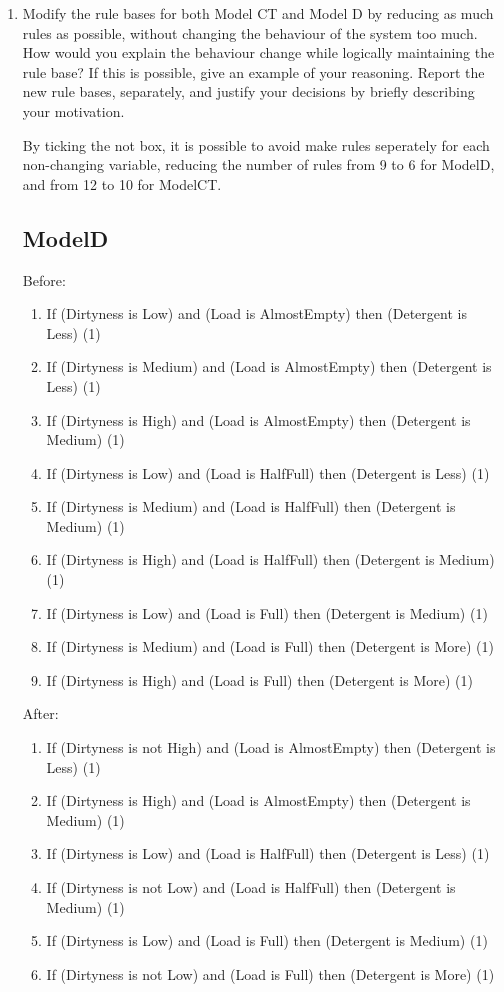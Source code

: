 \documentclass[11pt]{article}
\begin{document}
\begin{enumerate}[label=(\alph*)]
  \item Modify the rule bases for both Model CT and Model D by reducing as much
  rules as possible, without changing the behaviour of the system too much. How
  would you explain the behaviour change while logically maintaining the rule
  base? If this is possible, give an example of your reasoning. Report the new
  rule bases, separately, and justify your decisions by briefly describing your
  motivation.

  By ticking the not box, it is possible to avoid make rules seperately for each
  non-changing variable, reducing the number of rules from 9 to 6 for ModelD,
  and from 12 to 10 for ModelCT.

  \subsection*{ModelD}

  Before:
  \begin{enumerate}[label=(\arabic*)]
    \item If (Dirtyness is Low) and (Load is AlmostEmpty) then (Detergent is
    Less) (1)
    \item If (Dirtyness is Medium) and (Load is AlmostEmpty) then (Detergent is
    Less) (1)
    \item If (Dirtyness is High) and (Load is AlmostEmpty) then (Detergent is
    Medium) (1)
    \item If (Dirtyness is Low) and (Load is HalfFull) then (Detergent is Less)
    (1)
    \item If (Dirtyness is Medium) and (Load is HalfFull) then (Detergent is
    Medium) (1)
    \item If (Dirtyness is High) and (Load is HalfFull) then (Detergent is
    Medium) (1)
    \item If (Dirtyness is Low) and (Load is Full) then (Detergent is Medium)
    (1)
    \item If (Dirtyness is Medium) and (Load is Full) then (Detergent is More)
    (1)
    \item If (Dirtyness is High) and (Load is Full) then (Detergent is More) (1)
  \end{enumerate}

  After:
  \begin{enumerate}[label=(\arabic*)]
    \item If (Dirtyness is not High) and (Load is AlmostEmpty) then (Detergent
    is Less) (1)
    \item If (Dirtyness is High) and (Load is AlmostEmpty) then (Detergent is
    Medium) (1)
    \item If (Dirtyness is Low) and (Load is HalfFull) then (Detergent is Less)
    (1)
    \item If (Dirtyness is not Low) and (Load is HalfFull) then (Detergent
    is Medium) (1)
    \item If (Dirtyness is Low) and (Load is Full) then (Detergent is Medium)
    (1)
    \item If (Dirtyness is not Low) and (Load is Full) then (Detergent is More)
    (1)
  \end{enumerate}


\end{enumerate}
\end{document}
